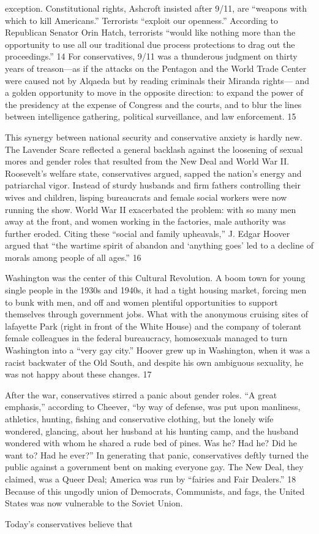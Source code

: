 exception. Constitutional rights, Ashcroft insisted after 9/11, are “weapons with which to kill Americans.” Terrorists “exploit our openness.” According to Republican Senator Orin Hatch, terrorists “would like nothing more than the opportunity to use all our traditional due process protections to drag out the proceedings.” {\color{blue} 14 } For conservatives, 9/11 was a thunderous judgment on thirty years of treason—as if the attacks on the Pentagon and the World Trade Center were caused not by Alqaeda but by reading criminals their Miranda rights— and a golden opportunity to move in the opposite direction: to expand the power of the presidency at the expense of Congress and the courts, and to blur the lines between intelligence gathering, political surveillance, and law enforcement. {\color{blue} 15 } {\par} This synergy between national security and conservative anxiety is hardly new. The Lavender Scare reflected a general backlash against the loosening of sexual mores and gender roles that resulted from the New Deal and World War II. Roosevelt’s welfare state, conservatives argued, sapped the nation’s energy and patriarchal vigor. Instead of sturdy husbands and firm fathers controlling their wives and children, lisping bureaucrats and female social workers were now running the show. World War II exacerbated the problem: with so many men away at the front, and women working in the factories, male authority was further eroded. Citing these “social and family upheavals,” J. Edgar Hoover argued that “the wartime spirit of abandon and ‘anything goes’ led to a decline of morals among people of all ages.” {\color{blue} 16 } {\par} Washington was the center of this Cultural Revolution. A boom town for young single people in the 1930s and 1940s, it had a tight housing market, forcing men to bunk with men, and off and women plentiful opportunities to support themselves through government jobs. What with the anonymous cruising sites of lafayette Park (right in front of the White House) and the company of tolerant female colleagues in the federal bureaucracy, homosexuals managed to turn Washington into a “very gay city.” Hoover grew up in Washington, when it was a racist backwater of the Old South, and despite his own ambiguous sexuality, he was not happy about these changes. {\color{blue} 17 } {\par} After the war, conservatives stirred a panic about gender roles. “A great emphasis,” according to Cheever, “by way of defense, was put upon manliness, athletics, hunting, fishing and conservative clothing, but the lonely wife wondered, glancing, about her husband at his hunting camp, and the husband wondered with whom he shared a rude bed of pines. Was he? Had he? Did he want to? Had he ever?” In generating that panic, conservatives deftly turned the public against a government bent on making everyone gay. The New Deal, they claimed, was a Queer Deal; America was run by “fairies and Fair Dealers.” {\color{blue} 18 } Because of this ungodly union of Democrats, Communists, and fags, the United States was now vulnerable to the Soviet Union.{\par} Today’s conservatives believe that 